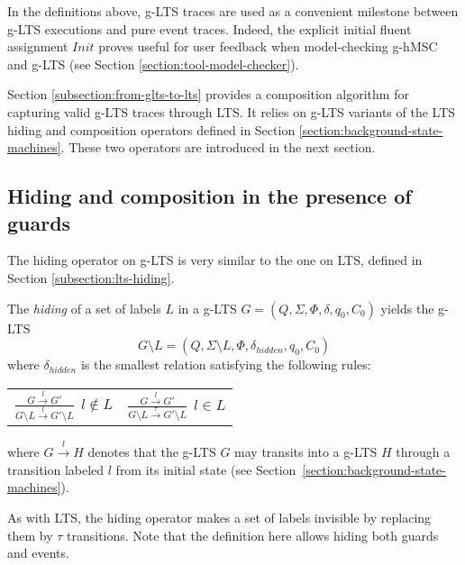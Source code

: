 In the definitions above, g-LTS traces are used as a convenient milestone between g-LTS executions and pure event traces. Indeed, the explicit initial fluent assignment $Init$ proves useful for user feedback when model-checking g-hMSC and g-LTS (see Section \ref{section:tool-model-checker}). 

Section \ref{subsection:from-glts-to-lts} provides a composition algorithm for capturing valid g-LTS traces through LTS. It relies on g-LTS variants of the LTS hiding and composition operators defined in Section \ref{section:background-state-machines}. These two operators are introduced in the next section.

\subsection{Hiding and composition in the presence of guards\label{subsection:glts-operators}}

The hiding operator on g-LTS is very similar to the one on LTS, defined in Section \ref{subsection:lts-hiding}. 

\begin{definition}
The \emph{hiding} of a set of labels $L$ in a g-LTS $G = (Q,\Sigma,\Phi,\delta,q_{0},C_{0})$ yields the g-LTS
\begin{equation*}
G \setminus L = (Q,\Sigma \setminus L,\Phi,\delta_{hidden},q_{0},C_0)
\end{equation*}
\noindent where $\delta_{hidden}$ is the smallest relation satisfying the following rules:
\begin{center}
\begin{tabular}{cc}
$\frac{\displaystyle G \stackrel{l}{\longrightarrow} G'}{\displaystyle G \setminus L \stackrel{l}{\longrightarrow} G' \setminus L}~~l \notin L$ & 
$\frac{\displaystyle G \stackrel{l}{\longrightarrow} G'}{\displaystyle G \setminus L \stackrel{\tau}{\longrightarrow} G' \setminus L}~~l \in L$ \\
\end{tabular}
\end{center}
where $G \stackrel{l}{\longrightarrow} H$ denotes that the g-LTS $G$ may transits into a g-LTS $H$ through a transition labeled $l$ from its initial state (see Section~\ref{section:background-state-machines}). 
\end{definition}

As with LTS, the hiding operator makes a set of labels invisible by replacing them by $\tau$ transitions. Note that the definition here allows hiding both guards and events. 

